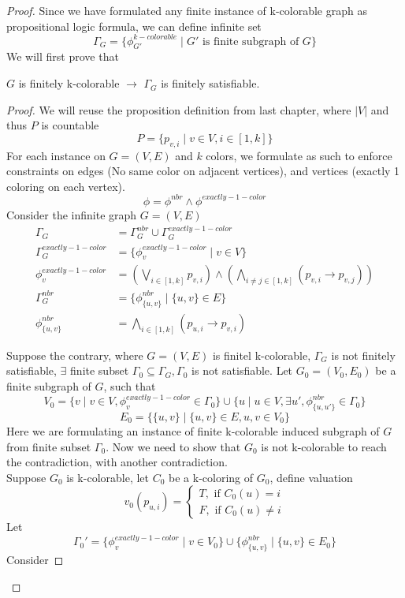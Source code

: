 \documentclass{article}
\newtheorem{lemma}[theorem]{Lemma}
\let\oldlemma\lemma
\let\endoldlemma\endlemma
\renewenvironment{lemma}
  {\begin{tcolorbox}[
      colback=green!8,
      colframe=green!50!black,
      boxrule=0.6pt,
      arc=2pt,
      left=6pt,right=6pt,top=4pt,bottom=4pt
    ]\oldlemma}
  {\endoldlemma\end{tcolorbox}}
\begin{document}
\begin{proof}
Since we have formulated any finite instance of k-colorable graph as propositional logic formula, we can define infinite set 
\[\Gamma_G = \{\phi_{G'}^{k-colorable}\mid G' \text{ is finite subgraph of } G\}\]
We will first prove that 
    \begin{lemma}
        $G$ is finitely k-colorable $\rightarrow$ $\Gamma_G$ is finitely satisfiable.
    \end{lemma}
    \begin{proof}
        We will reuse the proposition definition from last chapter, where $|V|$ and thus $P$ is countable
    \[P = \{p_{v, i} \mid v \in V, i \in [1, k]\}\]
        For each instance on $G = (V, E)$ and $k$ colors, we formulate as such to enforce constraints on edges (No same color on adjacent vertices),
        and vertices (exactly 1 coloring on each vertex).
        \[\phi = \phi^{nbr} \land \phi^{exactly-1-color}\]
        Consider the infinite graph $G = (V, E)$
        \begin{align*}
            \Gamma_G &= \Gamma^{nbr}_G \cup \Gamma^{exactly-1-color}_G\\
            \Gamma^{exactly-1-color}_G &= \{\phi^{exactly-1-color}_v \mid v \in V\}\\
            \phi^{exactly-1-color}_{v} &= (\bigvee_{i \in [1, k]}p_{v, i}) \land (\bigwedge_{i \neq j \in [1, k]} (p_{v, i} \rightarrow p_{v, j}))\\
            \Gamma^{nbr}_G &= \{\phi^{nbr}_{\{u, v\}} \mid \{u, v\} \in E\}\\
            \phi^{nbr}_{\{u, v\}} &= \bigwedge_{i \in [1, k]}(p_{u, i} \rightarrow p_{v, i})
        \end{align*}

    Suppose the contrary, where $G = (V, E)$ is finitel k-colorable, $\Gamma_G$ is not finitely satisfiable, 
    $\exists$ finite subset $ \Gamma_0 \subseteq \Gamma_G, \Gamma_0$ is not satisfiable. 
    Let $G_0 = (V_0, E_0)$ be a finite subgraph of $G$, such that 
    \[V_0 = \{v \mid v \in V, \phi^{exactly-1-color}_v \in \Gamma_0\} \cup \{u \mid u \in V, \exists u', \phi^{nbr}_{\{u, u'\}} \in \Gamma_0\}\]
    \[E_0 = \{\{u, v\} \mid \{u, v\} \in E, u, v \in V_0\}\]
    Here we are formulating an instance of finite k-colorable induced subgraph of $G$ from finite subset $\Gamma_0$. Now we need to show that $G_0$ is not k-colorable
    to reach the contradiction, with another contradiction. \\
    Suppose $G_0$ is k-colorable, let $C_0$ be a k-coloring of $G_0$, define valuation
    \[v_0(p_{u, i}) =\begin{cases}
        T, \text{ if } C_0(u) = i\\
        F, \text{ if } C_0(u) \neq i
    \end{cases} \]
    Let \[\Gamma_0' = \{\phi^{exactly-1-color}_v \mid v \in V_0\} \cup \{\phi^{nbr}_{\{u, v\}} \mid \{u, v\} \in E_0\}\]
    Consider 


\end{proof}
\end{proof}
\end{document}
